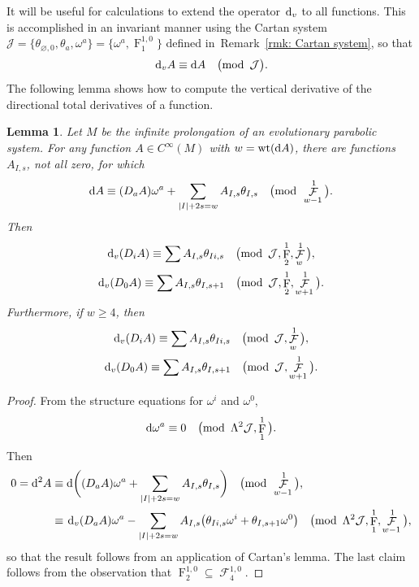 \documentclass[10pt,a4paper]{amsart}
\renewcommand{\d}{{\rm d}}
\renewcommand{\mod}[1]{\quad\big(\mathrm{mod\enspace} #1\big)}
\newcommand{\thetas}[1]{\theta_{#1}}
\newcommand{\thetanot}{\thetas{\varnothing,0}}
\DeclareMathOperator{\pwf}{F}
\DeclareMathOperator{\swf}{\mathcal{F}}
\DeclareMathOperator{\wt}{\mathrm{wt}}
\newcommand{\dv}{\ensuremath{\hspace{1pt} \d_v}}
\newcommand{\cartTheta}{\mathcal{J}}
\newcommand{\cMinfty}{C^\infty(M)}
\numberwithin{equation}{section}
\newtheorem{Lemma}[Theorem]{Lemma}
\begin{document}
It will be useful for calculations to extend the operator $\dv$ to all functions. This is accomplished in an invariant manner using the Cartan system $\cartTheta = \{\thetanot, \thetas{a}, \omega^a\} = \big\{\omega^a, \pwf^{1,0}_1\big\}$ defined in~Remark~\ref{rmk: Cartan system}, so that
\begin{gather*}
\dv A \equiv \d A \mod{\cartTheta} .
\end{gather*}
The following lemma shows how to compute the vertical derivative of the directional total derivatives of a function.
\begin{Lemma}\label{thm:(lem) vertical derivative of directional derivative, sub-principal weights}
 Let $M$ be the infinite prolongation of an evolutionary parabolic system. For any function $A \in \cMinfty$ with $w = \wt(\d A)$, there are functions $A_{I,s}$, not all zero, for which
 \begin{gather*}
 \d A \equiv (D_aA)\omega^a + \sum_{|I|+2s = w} A_{I,s}\thetas{I,s} \mod{\swf^1_{w-1}} .
 \end{gather*}
 Then
 \begin{gather*}
 \dv(D_i A) \equiv \sum A_{I,s}\thetas{Ii,s} \mod{\cartTheta, \pwf^1_2, \swf^1_{w}} ,
 \\
 \dv(D_0 A) \equiv \sum A_{I,s}\thetas{I,s+1} \mod{\cartTheta, \pwf^1_2, \swf^1_{w+1}} .
 \end{gather*}
 Furthermore, if $w \ge 4$, then
 \begin{gather*}
 \dv(D_i A) \equiv \sum A_{I,s}\thetas{Ii,s} \mod{\cartTheta, \swf^1_{w}} ,
 \\
 \dv(D_0 A) \equiv \sum A_{I,s}\thetas{I,s+1} \mod{\cartTheta, \swf^1_{w+1}} .
 \end{gather*}
\end{Lemma}
\begin{proof}
 From the structure equations for $\omega^i$ and $\omega^0$,
 \begin{gather*}
 \d\omega^a \equiv 0 \mod{\Lambda^2\cartTheta, \pwf^1_1} .
 \end{gather*}
 Then
 \begin{align*}
 0 = \d^2 A \equiv{}& \d \bigg((D_a A)\omega^a + \sum_{|I|+2s = w} A_{I,s}\thetas{I,s}\bigg) \mod{\swf^1_{w-1}}, \\
 \equiv{}& \dv (D_a A)\omega^a - \sum_{|I|+2s = w} A_{I,s}\big(\thetas{Ii,s}\omega^i + \thetas{I,s+1}\omega^0\big) \mod{\Lambda^2 \cartTheta, \pwf^1_1, \swf^1_{w-1}} ,
 \end{align*}
 so that the result follows from an application of Cartan's lemma.
 The last claim follows from the observation that $\pwf^{1,0}_2 \subseteq \swf^{1,0}_4$.
\end{proof}
\end{document}
